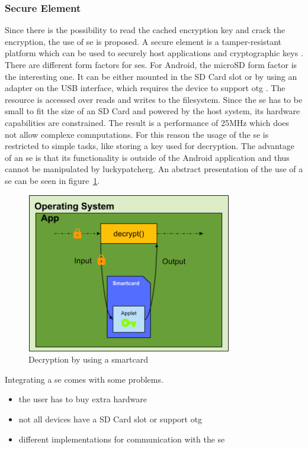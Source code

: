 \subsubsection{Secure Element} \label{section:counter-replace-encryption-key-local}
Since there is the possibility to read the cached encryption key \cite{memoryDump} and crack the encryption, the use of \gls{se} is proposed.
A secure element is a tamper-resistant platform which can be used to securely host applications and cryptographic keys \cite{seDefinition}.
There are different form factors for \gls{se}s.
For Android, the microSD form factor is the interesting one.
It can be either mounted in the SD Card slot or by using an adapter on the USB interface, which requires the device to support \gls{otg} \cite{usbOtg}.
The resource is accessed over reads and writes to the filesystem.
Since the \gls{se} has to be small to fit the size of an SD Card and powered by the host system, its hardware capabilities are constrained.
The result is a performance of 25MHz which does not allow complexe comnputations. \cite{stSe}
\newline
For this reason the usage of the \gls{se} is restricted to simple tasks, like storing a key used for decryption.
The advantage of an \gls{se} is that its functionality is outside of the Android application and thus cannot be manipulated by \gls{luckypatcherg}.
\newline
An abstract presentation of the use of a \gls{se} can be seen in figure~\ref{fig:encryptionKeySmart}.
\newline
\begin{figure}[h]
    \centering
    \includegraphics[width=0.8\textwidth]{data/encryptionKeySmart.png}
    \caption{Decryption by using a smartcard}
    \label{fig:encryptionKeySmart}
\end{figure}
Integrating a \gls{se} comes with some problems.
\begin{itemize}
  \item the user has to buy extra hardware
  \item not all devices have a SD Card slot or support \gls{otg}
  \item different implementations for communication with the \gls{se}
\end{itemize}



